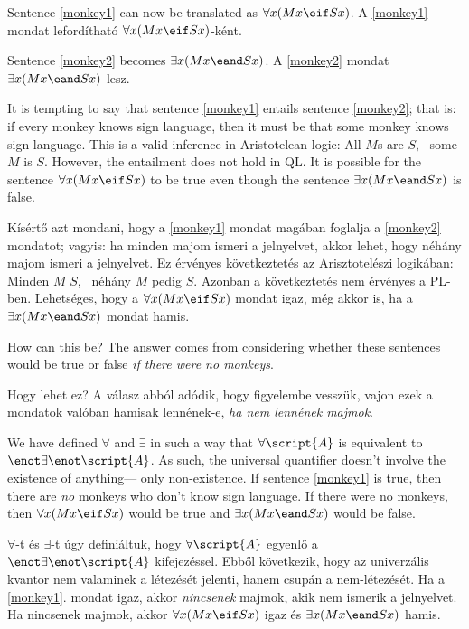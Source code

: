 Sentence \ref{monkey1} can now be translated as $\forall x(Mx \eif Sx)$.
A \ref{monkey1} mondat lefordítható $\forall x(Mx \eif Sx)$-ként.

Sentence \ref{monkey2} becomes $\exists x(Mx \eand Sx)$.
A \ref{monkey2} mondat $\exists x(Mx \eand Sx)$ lesz.


It is tempting to say that sentence \ref{monkey1} entails sentence \ref{monkey2}; that is: if every monkey knows sign language, then it must be that some monkey knows sign language. This is a valid inference in Aristotelean logic: All $M$s are $S$, \therefore\ some $M$ is $S$. However, the entailment does not hold in QL. It is possible for the sentence $\forall x(Mx \eif Sx)$ to be true even though the sentence $\exists x(Mx \eand Sx)$ is false.

Kísértő azt mondani, hogy a \ref{monkey1} mondat magában foglalja a \ref{monkey2} mondatot; vagyis: ha minden majom ismeri a jelnyelvet, akkor lehet, hogy néhány majom ismeri a jelnyelvet. Ez érvényes következtetés az Arisztotelészi logikában: Minden $M$ $S$, \therefore\ néhány $M$ pedig $S$. Azonban a következtetés nem érvényes a PL-ben. Lehetséges, hogy a $\forall x(Mx \eif Sx)$ mondat igaz, még akkor is, ha a $\exists x(Mx \eand Sx)$ mondat hamis.


How can this be? The answer comes from considering whether these sentences would be true or false \emph{if there were no monkeys}.

Hogy lehet ez? A válasz abból adódik, hogy figyelembe vesszük, vajon ezek a mondatok valóban hamisak lennének-e, \emph{ha nem lennének majmok}.



We have defined $\forall$ and $\exists$ in such a way that $\forall\script{A}$ is equivalent to $\enot \exists\enot \script{A}$. As such, the universal quantifier doesn't involve the existence of anything--- only non-existence. If sentence \ref{monkey1} is true, then there are \emph{no} monkeys who don't know sign language. If there were no monkeys, then $\forall x(Mx \eif Sx)$ would be true and $\exists x(Mx \eand Sx)$ would be false.

$\forall$-t és $\exists$-t úgy definiáltuk, hogy $\forall\script{A}$ egyenlő a $\enot \exists\enot \script{A}$ kifejezéssel. Ebből következik, hogy az univerzális kvantor nem valaminek a létezését jelenti, hanem csupán a nem-létezését. Ha a \ref{monkey1}. mondat igaz, akkor \emph{nincsenek} majmok, akik nem ismerik a jelnyelvet. Ha nincsenek majmok, akkor $\forall x(Mx \eif Sx)$ igaz és $\exists x(Mx \eand Sx)$ hamis.

